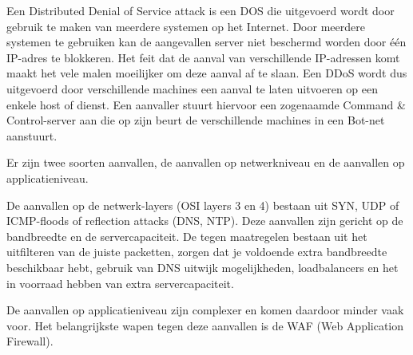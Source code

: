 Een Distributed Denial of Service attack is een DOS die uitgevoerd wordt door gebruik te maken van meerdere systemen op het Internet. Door meerdere systemen te gebruiken kan de aangevallen server niet beschermd worden door \'e\'en IP-adres te blokkeren. Het feit dat de aanval van verschillende IP-adressen komt maakt het vele malen moeilijker om deze aanval af te slaan. Een DDoS wordt dus uitgevoerd door verschillende machines een aanval te laten uitvoeren op een enkele host of dienst. Een aanvaller stuurt hiervoor een zogenaamde Command \& Control-server aan die op zijn beurt de verschillende machines in een Bot-net aanstuurt.

Er zijn twee soorten aanvallen, de aanvallen op netwerkniveau en de aanvallen op applicatieniveau.

De aanvallen op de netwerk-layers (OSI layers 3 en 4) bestaan uit SYN, UDP of ICMP-floods of reflection attacks (DNS, NTP). Deze aanvallen zijn gericht op de bandbreedte en de servercapaciteit. De tegen maatregelen bestaan uit het uitfilteren van de juiste packetten, zorgen dat je voldoende extra bandbreedte beschikbaar hebt, gebruik van DNS uitwijk mogelijkheden, loadbalancers en het in voorraad hebben van extra servercapaciteit.

De aanvallen op applicatieniveau zijn complexer en komen daardoor minder vaak voor. Het belangrijkste wapen tegen deze aanvallen is de WAF (Web Application Firewall).
